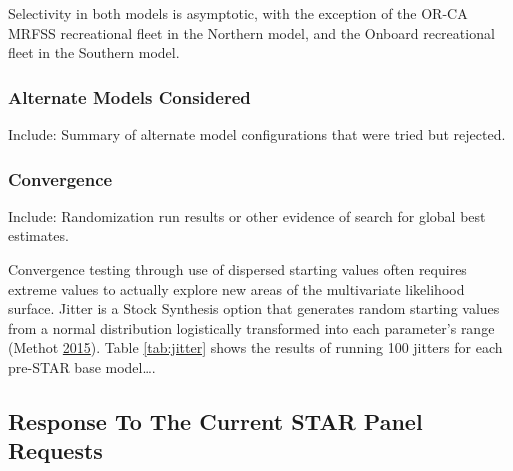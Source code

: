 \documentclass[12pt,]{article}
\begin{document}
Selectivity in both models is asymptotic, with the exception of the
OR-CA MRFSS recreational fleet in the Northern model, and the Onboard
recreational fleet in the Southern model.

\subsubsection{Alternate Models
Considered}\label{alternate-models-considered}

Include: Summary of alternate model configurations that were tried but
rejected.

\subsubsection{Convergence}\label{convergence}

Include: Randomization run results or other evidence of search for
global best estimates.

Convergence testing through use of dispersed starting values often
requires extreme values to actually explore new areas of the
multivariate likelihood surface. Jitter is a Stock Synthesis option that
generates random starting values from a normal distribution logistically
transformed into each parameter's range (Methot
\protect\hyperlink{ref-Methot2015}{2015}). Table \ref{tab:jitter} shows
the results of running 100 jitters for each pre-STAR base model\ldots{}.

\subsection{Response To The Current STAR Panel
Requests}\label{response-to-the-current-star-panel-requests}
\end{document}
